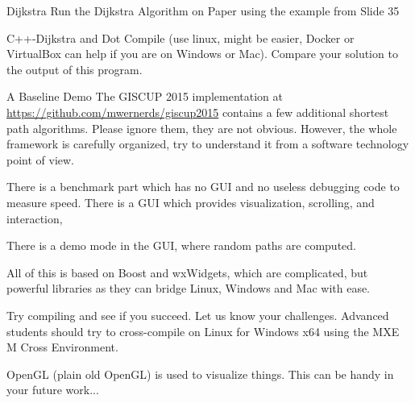 \documentclass[twoside]{article}
\begin{document}
\maketitle

\begin{task}{Dijkstra}{}{}
  Run the Dijkstra Algorithm on Paper using the example from Slide 35
\end{task}

\begin{task}{C++-Dijkstra and Dot}{}{}
  Compile (use linux, might be easier, Docker or VirtualBox can help if you are on Windows or Mac).
  Compare your solution to the output of this program.
\end{task}

\begin{task}{A Baseline Demo}{}{}
  The GISCUP 2015 implementation at \url{https://github.com/mwernerds/giscup2015} contains a few additional shortest path algorithms. Please ignore them, they are
  not obvious. However, the whole framework is carefully organized, try to understand it from a software technology
  point of view.

  There is a benchmark part which has no GUI and no useless debugging code to measure speed. There is a GUI which provides visualization, scrolling, and interaction,

  There is a demo mode in the GUI, where random paths are computed. 

  All of this is based on Boost and wxWidgets, which are complicated, but powerful libraries as they can bridge
  Linux, Windows and Mac with ease.

  Try compiling and see if you succeed. Let us know your challenges. Advanced students should try to cross-compile on Linux for Windows x64 using the MXE M Cross Environment.
  
  OpenGL (plain old OpenGL) is used to visualize things. This can be handy in your future work...
\end{task}
\end{document}
